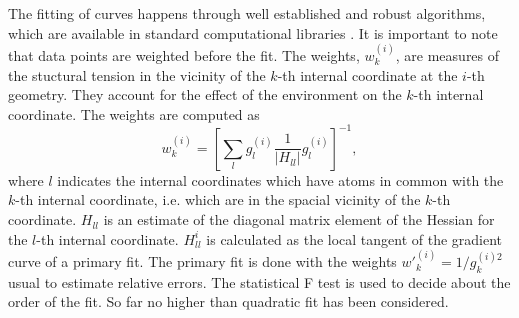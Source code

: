 \documentclass[prl,aps,twocolumn,showpacs,twocolumngrid,superbib]{revtex4}
\begin{document}
The fitting of curves happens through 
well established and robust algorithms, which are available in standard 
computational libraries 
\cite{slatec}. 
It is important to note
that data points are weighted before the fit. The weights, 
$w_{k}^{(i)}$, are
measures of the stuctural tension in the vicinity of the $k$-th internal
coordinate at the $i$-th geometry. They account for the effect of the 
environment on the $k$-th internal coordinate. 
The weights are computed as
\begin{equation}
w_{k}^{(i)} = \left[ \sum_{l} g_{l}^{(i)} \frac{1}{|H_{ll}^{}|} g_{l}^{(i)} \right]^{-1} ,
\end{equation}
where $l$ indicates the internal coordinates which have atoms in common
with the $k$-th internal coordinate, i.e. which are in the spacial 
vicinity of the $k$-th coordinate. $H_{ll}^{}$ is an estimate
of the diagonal matrix element of the Hessian for the $l$-th 
internal coordinate. $H_{ll}^{i}$ is calculated as the local tangent
of the gradient curve of a primary fit. 
The primary fit is done with 
the weights $w{'}_{k}^{(i)} = 1/g_{k}^{(i)2}$ usual to 
estimate relative errors.
The statistical F test is used to decide about the order of the fit. 
So far no higher than quadratic fit has been considered.
\end{document}
